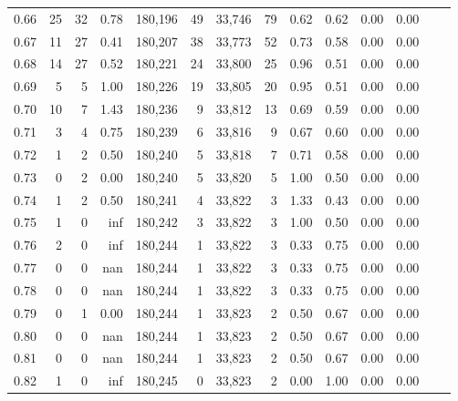 \begin{tabular}{rrrrrrrrrrrrrr}
0.66 &     25 &     32 &    0.78 &  180,196 &       49 &  33,746 &      79 &  0.62 &  0.62 &  0.00 &      0.00 \\
0.67 &     11 &     27 &    0.41 &  180,207 &       38 &  33,773 &      52 &  0.73 &  0.58 &  0.00 &      0.00 \\
0.68 &     14 &     27 &    0.52 &  180,221 &       24 &  33,800 &      25 &  0.96 &  0.51 &  0.00 &      0.00 \\
0.69 &      5 &      5 &    1.00 &  180,226 &       19 &  33,805 &      20 &  0.95 &  0.51 &  0.00 &      0.00 \\
0.70 &     10 &      7 &    1.43 &  180,236 &        9 &  33,812 &      13 &  0.69 &  0.59 &  0.00 &      0.00 \\
0.71 &      3 &      4 &    0.75 &  180,239 &        6 &  33,816 &       9 &  0.67 &  0.60 &  0.00 &      0.00 \\
0.72 &      1 &      2 &    0.50 &  180,240 &        5 &  33,818 &       7 &  0.71 &  0.58 &  0.00 &      0.00 \\
0.73 &      0 &      2 &    0.00 &  180,240 &        5 &  33,820 &       5 &  1.00 &  0.50 &  0.00 &      0.00 \\
0.74 &      1 &      2 &    0.50 &  180,241 &        4 &  33,822 &       3 &  1.33 &  0.43 &  0.00 &      0.00 \\
0.75 &      1 &      0 &     inf &  180,242 &        3 &  33,822 &       3 &  1.00 &  0.50 &  0.00 &      0.00 \\
0.76 &      2 &      0 &     inf &  180,244 &        1 &  33,822 &       3 &  0.33 &  0.75 &  0.00 &      0.00 \\
0.77 &      0 &      0 &     nan &  180,244 &        1 &  33,822 &       3 &  0.33 &  0.75 &  0.00 &      0.00 \\
0.78 &      0 &      0 &     nan &  180,244 &        1 &  33,822 &       3 &  0.33 &  0.75 &  0.00 &      0.00 \\
0.79 &      0 &      1 &    0.00 &  180,244 &        1 &  33,823 &       2 &  0.50 &  0.67 &  0.00 &      0.00 \\
0.80 &      0 &      0 &     nan &  180,244 &        1 &  33,823 &       2 &  0.50 &  0.67 &  0.00 &      0.00 \\
0.81 &      0 &      0 &     nan &  180,244 &        1 &  33,823 &       2 &  0.50 &  0.67 &  0.00 &      0.00 \\
0.82 &      1 &      0 &     inf &  180,245 &        0 &  33,823 &       2 &  0.00 &  1.00 &  0.00 &      0.00 \\

\end{tabular}
